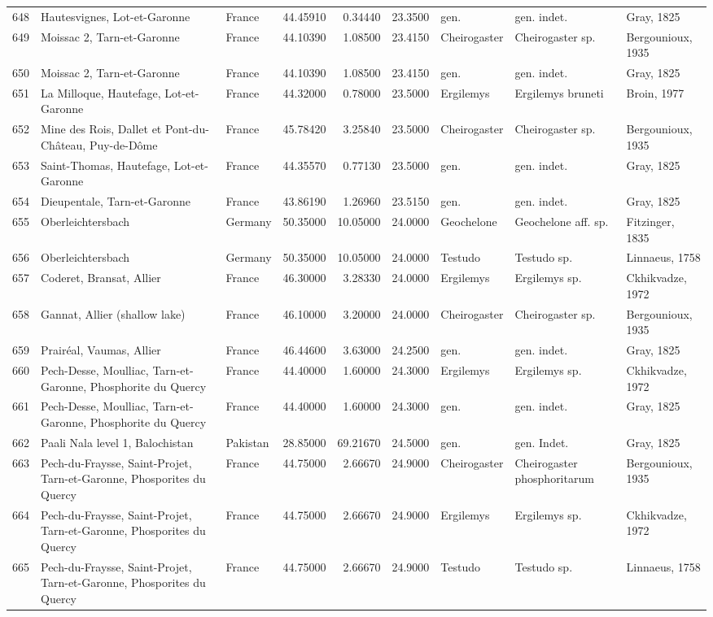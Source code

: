 \begin{landscape}
{\begin{longtable}[]{@{}lllrrrlll@{}}
648 & Hautesvignes, Lot-et-Garonne & France & 44.45910 & 0.34440 &
23.3500 & gen. & gen. indet. & Gray, 1825\tabularnewline
649 & Moissac 2, Tarn-et-Garonne & France & 44.10390 & 1.08500 & 23.4150
& Cheirogaster & Cheirogaster sp. & Bergounioux, 1935\tabularnewline
650 & Moissac 2, Tarn-et-Garonne & France & 44.10390 & 1.08500 & 23.4150
& gen. & gen. indet. & Gray, 1825\tabularnewline
651 & La Milloque, Hautefage, Lot-et-Garonne & France & 44.32000 &
0.78000 & 23.5000 & Ergilemys & Ergilemys bruneti & Broin,
1977\tabularnewline
652 & Mine des Rois, Dallet et Pont-du-Château, Puy-de-Dôme & France &
45.78420 & 3.25840 & 23.5000 & Cheirogaster & Cheirogaster sp. &
Bergounioux, 1935\tabularnewline
653 & Saint-Thomas, Hautefage, Lot-et-Garonne & France & 44.35570 &
0.77130 & 23.5000 & gen. & gen. indet. & Gray, 1825\tabularnewline
654 & Dieupentale, Tarn-et-Garonne & France & 43.86190 & 1.26960 &
23.5150 & gen. & gen. indet. & Gray, 1825\tabularnewline
655 & Oberleichtersbach & Germany & 50.35000 & 10.05000 & 24.0000 &
Geochelone & Geochelone aff. sp. & Fitzinger, 1835\tabularnewline
656 & Oberleichtersbach & Germany & 50.35000 & 10.05000 & 24.0000 &
Testudo & Testudo sp. & Linnaeus, 1758\tabularnewline
657 & Coderet, Bransat, Allier & France & 46.30000 & 3.28330 & 24.0000 &
Ergilemys & Ergilemys sp. & Ckhikvadze, 1972\tabularnewline
658 & Gannat, Allier (shallow lake) & France & 46.10000 & 3.20000 &
24.0000 & Cheirogaster & Cheirogaster sp. & Bergounioux,
1935\tabularnewline
659 & Prairéal, Vaumas, Allier & France & 46.44600 & 3.63000 & 24.2500 &
gen. & gen. indet. & Gray, 1825\tabularnewline
660 & Pech-Desse, Moulliac, Tarn-et-Garonne, Phosphorite du Quercy &
France & 44.40000 & 1.60000 & 24.3000 & Ergilemys & Ergilemys sp. &
Ckhikvadze, 1972\tabularnewline
661 & Pech-Desse, Moulliac, Tarn-et-Garonne, Phosphorite du Quercy &
France & 44.40000 & 1.60000 & 24.3000 & gen. & gen. indet. & Gray,
1825\tabularnewline
662 & Paali Nala level 1, Balochistan & Pakistan & 28.85000 & 69.21670 &
24.5000 & gen. & gen. Indet. & Gray, 1825\tabularnewline
663 & Pech-du-Fraysse, Saint-Projet, Tarn-et-Garonne, Phosporites du
Quercy & France & 44.75000 & 2.66670 & 24.9000 & Cheirogaster &
Cheirogaster phosphoritarum & Bergounioux, 1935\tabularnewline
664 & Pech-du-Fraysse, Saint-Projet, Tarn-et-Garonne, Phosporites du
Quercy & France & 44.75000 & 2.66670 & 24.9000 & Ergilemys & Ergilemys
sp. & Ckhikvadze, 1972\tabularnewline
665 & Pech-du-Fraysse, Saint-Projet, Tarn-et-Garonne, Phosporites du
Quercy & France & 44.75000 & 2.66670 & 24.9000 & Testudo & Testudo sp. &
Linnaeus, 1758\tabularnewline

\end{longtable}}
\end{landscape}
